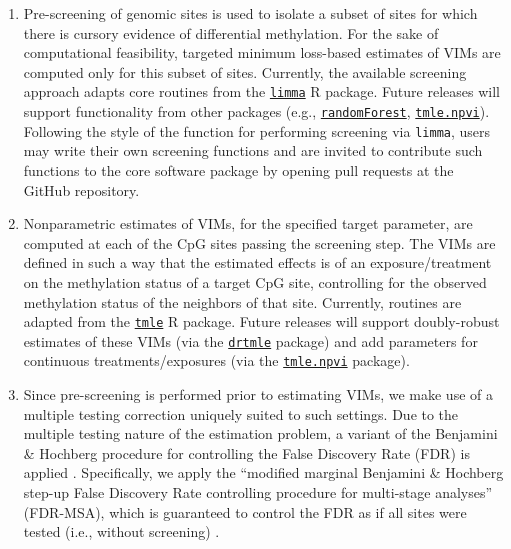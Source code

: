 \documentclass[9pt,a4paper,]{extarticle}
\theoremstyle{definition}
\theoremstyle{definition}
\theoremstyle{definition}
\theoremstyle{remark}
\begin{document}
\begin{enumerate}
\def\labelenumi{\arabic{enumi}.}
\item
  Pre-screening of genomic sites is used to isolate a subset of sites for
  which there is cursory evidence of differential methylation. For the sake of
  computational feasibility, targeted minimum loss-based estimates of VIMs are
  computed only for this subset of sites. Currently, the available screening
  approach adapts core routines from the
  \href{http://bioconductor.org/packages/limma}{\texttt{limma}} R
  package. Future releases will support functionality from other packages
  (e.g., \href{https://CRAN.R-project.org/package=randomForest}{\texttt{randomForest}},
  \href{https://CRAN.R-project.org/package=tmle.npvi}{\texttt{tmle.npvi}}). Following the
  style of the function for performing screening via \texttt{limma}, users may write
  their own screening functions and are invited to contribute such functions to
  the core software package by opening pull requests at the GitHub repository.
\item
  Nonparametric estimates of VIMs, for the specified target parameter, are
  computed at each of the CpG sites passing the screening step. The VIMs are
  defined in such a way that the estimated effects is of an exposure/treatment
  on the methylation status of a target CpG site, controlling for the observed
  methylation status of the neighbors of that site. Currently, routines are
  adapted from the \href{https://CRAN.R-project.org/package=tmle}{\texttt{tmle}} R package.
  Future releases will support doubly-robust estimates of these VIMs (via the
  \href{https://cran.r-project.org/package=drtmle}{\texttt{drtmle}} package)
  and add parameters for continuous treatments/exposures (via the
  \href{https://CRAN.R-project.org/package=tmle.npvi}{\texttt{tmle.npvi}} package).
\item
  Since pre-screening is performed prior to estimating VIMs, we make use of a
  multiple testing correction uniquely suited to such settings. Due to the
  multiple testing nature of the estimation problem, a variant of the Benjamini
  \& Hochberg procedure for controlling the False Discovery Rate (FDR) is
  applied \citep{benjamini1995controlling}. Specifically, we apply the ``modified
  marginal Benjamini \& Hochberg step-up False Discovery Rate controlling
  procedure for multi-stage analyses'' (FDR-MSA), which is guaranteed to
  control the FDR as if all sites were tested (i.e., without screening)
  \citep{tuglus2009modified}.
\end{enumerate}
\end{document}
